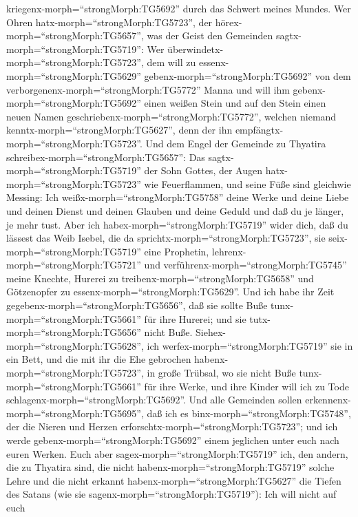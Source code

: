 kriegenx-morph=``strongMorph:TG5692'' durch das Schwert meines Mundes.
 Wer Ohren hatx-morph=``strongMorph:TG5723'', der
hörex-morph=``strongMorph:TG5657'', was der Geist den Gemeinden
sagtx-morph=``strongMorph:TG5719'': Wer
überwindetx-morph=``strongMorph:TG5723'', dem will zu
essenx-morph=``strongMorph:TG5629'' gebenx-morph=``strongMorph:TG5692''
von dem verborgenenx-morph=``strongMorph:TG5772'' Manna und will ihm
gebenx-morph=``strongMorph:TG5692'' einen weißen Stein und auf den Stein
einen neuen Namen geschriebenx-morph=``strongMorph:TG5772'', welchen
niemand kenntx-morph=``strongMorph:TG5627'', denn der ihn
empfängtx-morph=``strongMorph:TG5723''.  Und dem Engel der
Gemeinde zu Thyatira schreibex-morph=``strongMorph:TG5657'': Das
sagtx-morph=``strongMorph:TG5719'' der Sohn Gottes, der Augen
hatx-morph=``strongMorph:TG5723'' wie Feuerflammen, und seine Füße sind
gleichwie Messing:  Ich weißx-morph=``strongMorph:TG5758''
deine Werke und deine Liebe und deinen Dienst und deinen Glauben und
deine Geduld und daß du je länger, je mehr tust.  Aber ich
habex-morph=``strongMorph:TG5719'' wider dich, daß du lässest das Weib
Isebel, die da sprichtx-morph=``strongMorph:TG5723'', sie
seix-morph=``strongMorph:TG5719'' eine Prophetin,
lehrenx-morph=``strongMorph:TG5721'' und
verführenx-morph=``strongMorph:TG5745'' meine Knechte, Hurerei zu
treibenx-morph=``strongMorph:TG5658'' und Götzenopfer zu
essenx-morph=``strongMorph:TG5629''.  Und ich habe ihr Zeit
gegebenx-morph=``strongMorph:TG5656'', daß sie sollte Buße
tunx-morph=``strongMorph:TG5661'' für ihre Hurerei; und sie
tutx-morph=``strongMorph:TG5656'' nicht Buße. 
Siehex-morph=``strongMorph:TG5628'', ich
werfex-morph=``strongMorph:TG5719'' sie in ein Bett, und die mit ihr die
Ehe gebrochen habenx-morph=``strongMorph:TG5723'', in große Trübsal, wo
sie nicht Buße tunx-morph=``strongMorph:TG5661'' für ihre Werke,
 und ihre Kinder will ich zu Tode
schlagenx-morph=``strongMorph:TG5692''. Und alle Gemeinden sollen
erkennenx-morph=``strongMorph:TG5695'', daß ich es
binx-morph=``strongMorph:TG5748'', der die Nieren und Herzen
erforschtx-morph=``strongMorph:TG5723''; und ich werde
gebenx-morph=``strongMorph:TG5692'' einem jeglichen unter euch nach
euren Werken.  Euch aber sagex-morph=``strongMorph:TG5719''
ich, den andern, die zu Thyatira sind, die nicht
habenx-morph=``strongMorph:TG5719'' solche Lehre und die nicht erkannt
habenx-morph=``strongMorph:TG5627'' die Tiefen des Satans (wie sie
sagenx-morph=``strongMorph:TG5719''): Ich will nicht auf euch
